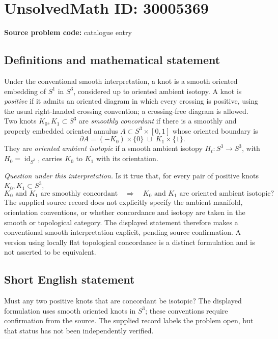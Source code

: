 \documentclass[11pt]{article}
\begin{document}
\section*{UnsolvedMath ID: 30005369}
\textbf{Source problem code:} catalogue entry
\subsection{Definitions and mathematical statement}
Under the conventional smooth interpretation, a knot is a smooth oriented embedding of \(S^1\) in \(S^3\), considered up to oriented ambient isotopy. A knot is \emph{positive} if it admits an oriented diagram in which every crossing is positive, using the usual right-handed crossing convention; a crossing-free diagram is allowed. Two knots \(K_0,K_1\subset S^3\) are \emph{smoothly concordant} if there is a smoothly and properly embedded oriented annulus \(A\subset S^3\times[0,1]\) whose oriented boundary is
\[
\partial A=(-K_0)\times\{0\}\;\sqcup\;K_1\times\{1\}.
\]
They are \emph{oriented ambient isotopic} if a smooth ambient isotopy \(H_t:S^3\to S^3\), with \(H_0=\operatorname{id}_{S^3}\), carries \(K_0\) to \(K_1\) with its orientation.

\emph{Question under this interpretation.} Is it true that, for every pair of positive knots \(K_0,K_1\subset S^3\),
\[
K_0\text{ and }K_1\text{ are smoothly concordant}
\quad\Longrightarrow\quad
K_0\text{ and }K_1\text{ are oriented ambient isotopic}?
\]
The supplied source record does not explicitly specify the ambient manifold, orientation conventions, or whether concordance and isotopy are taken in the smooth or topological category. The displayed statement therefore makes a conventional smooth interpretation explicit, pending source confirmation. A version using locally flat topological concordance is a distinct formulation and is not asserted to be equivalent.
\subsection{Short English statement}
Must any two positive knots that are concordant be isotopic? The displayed formulation uses smooth oriented knots in \(S^3\); these conventions require confirmation from the source. The supplied record labels the problem open, but that status has not been independently verified.
\end{document}
